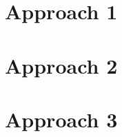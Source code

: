 \documentclass[letterpaper,10.5pt]{article}
\begin{document}
\section{Approach 1}


\section{Approach 2}


\section{Approach 3}

\end{document}
